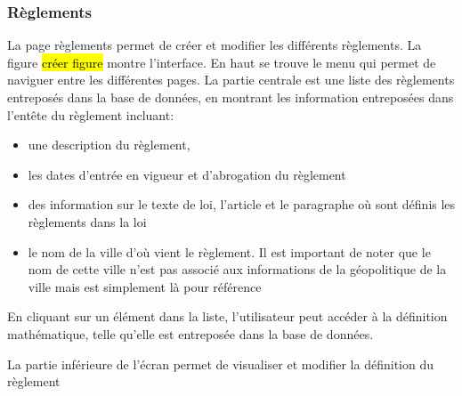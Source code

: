 \subsubsection{Règlements}
La page règlements permet de créer et modifier les différents règlements. La figure \hl{créer figure }montre l'interface. En haut se trouve le menu qui permet de naviguer entre les différentes pages. La partie centrale est une liste des règlements entreposés dans la base de données, en montrant les information entreposées dans l'entête du règlement incluant:
\begin{itemize}
    \item une description du règlement, 
    \item les dates d'entrée en vigueur et d'abrogation du règlement
    \item des information sur le texte de loi, l'article et le paragraphe où sont définis les règlements dans la loi
    \item le nom de la ville d'où vient le règlement. Il est important de noter que le nom de cette ville n'est pas associé aux informations de la géopolitique de la ville mais est simplement là pour référence
\end{itemize}
En cliquant sur un élément dans la liste, l'utilisateur peut accéder à la définition mathématique, telle qu'elle est entreposée dans la base de données.\par
La partie inférieure de l'écran permet de visualiser et modifier la définition du règlement

